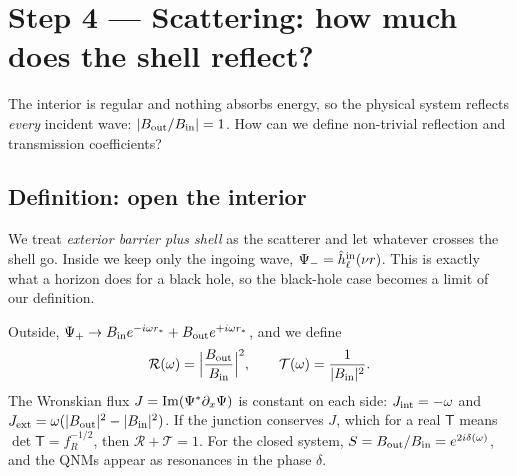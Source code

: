 \documentclass[11pt,a4paper]{article}
\numberwithin{equation}{section}
\newcommand{\RR}{\mathcal R}
\newcommand{\TT}{\mathcal T}
\begin{document}
\section{Step 4 --- Scattering: how much does the shell reflect?}\label{sec:scatt}
\begin{question}
The interior is regular and nothing absorbs energy, so the physical system reflects \emph{every} incident wave:
$|B_{\rm out}/B_{\rm in}|=1$. How can we define non-trivial reflection and transmission coefficients?
\end{question}

\subsection{Definition: open the interior}
\begin{keyidea}
We treat \emph{exterior barrier plus shell} as the scatterer and let whatever crosses the shell go. Inside we keep only
the ingoing wave, $\Psi_-=\hat h^{\rm in}_\ell(\nu r)$. This is exactly what a horizon does for a black hole, so the black-hole
case becomes a limit of our definition.
\end{keyidea}
Outside, $\Psi_+\to B_{\rm in}e^{-i\omega r_*}+B_{\rm out}e^{+i\omega r_*}$, and we define
\begin{equation}
\RR(\omega)=\Big|\frac{B_{\rm out}}{B_{\rm in}}\Big|^2,\qquad \TT(\omega)=\frac1{|B_{\rm in}|^2}.
\end{equation}
The Wronskian flux $J={\rm Im}(\Psi^*\partial_x\Psi)$ is constant on each side: $J_{\rm int}=-\omega$ and
$J_{\rm ext}=\omega(|B_{\rm out}|^2-|B_{\rm in}|^2)$. If the junction conserves $J$, which for a real $\mathsf T$ means
$\det\mathsf T=f_R^{-1/2}$, then $\RR+\TT=1$. For the closed system, $S=B_{\rm out}/B_{\rm in}=e^{2i\delta(\omega)}$, and the QNMs
appear as resonances in the phase $\delta$.
\end{document}
